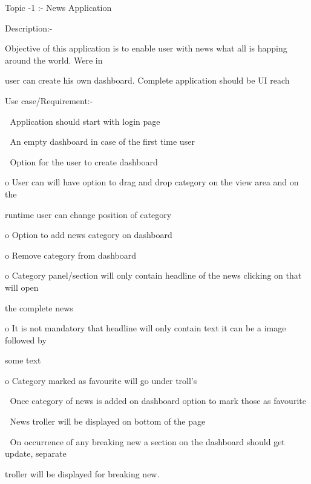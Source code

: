 Topic -1 :- News  Application

Description:-  

Objective of this application is to enable user with news what all is happing around the world. Were in 

user can create his own dashboard.  Complete application should be UI reach

Use case/Requirement:- 

 Application should start with login page

 An empty dashboard in case of the first time user

 Option for the user to create dashboard

o User can will have option to drag and drop category on the view area and on the 

runtime user can change position of category

o Option to add news category on dashboard

o Remove  category from dashboard

o Category panel/section will only contain headline of the news clicking on that will open 

the complete news

o It is not mandatory that headline will only contain text it can be a image followed by 

some text 

o Category marked as favourite will go under troll's

 Once category of news is added on dashboard option to mark those as favourite

 News troller will be displayed on bottom of the page

 On occurrence of any breaking new a section on the dashboard should get update, separate 

troller will be displayed for breaking new.